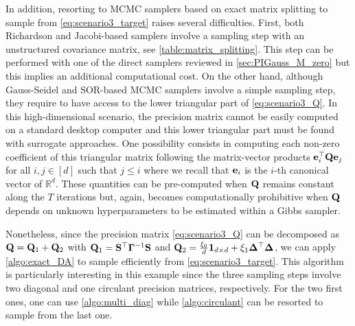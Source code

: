 \documentclass[nohypdvips,onefignum,onetabnum]{siamart171218}
\begin{document}
In addition, resorting to  MCMC samplers based on exact matrix splitting to sample from \cref{eq:scenario3_target} raises several difficulties.
First, both Richardson and Jacobi-based samplers involve a sampling step with an unstructured covariance matrix, see \cref{table:matrix_splitting}.
This step can be performed with one of the direct samplers reviewed in \cref{sec:PIGauss_M_zero} but this implies an additional computational cost.
On the other hand, although Gauss-Seidel and SOR-based MCMC samplers involve a simple sampling step, they require to have access to the lower triangular part of \cref{eq:scenario3_Q}.
In this high-dimensional scenario, the precision matrix cannot be easily computed on a standard desktop computer and this lower triangular part must be found with surrogate approaches.
One possibility consists in computing each non-zero coefficient of this triangular matrix following the matrix-vector products $\mathbf{e}_i^{\top}\mathbf{Q}\mathbf{e}_j$ for all $i,j \in [d]$ such that $j \leq i$ where we recall that $\mathbf{e}_i$ is the $i$-th canonical vector of $\mathbb{R}^d$.
These quantities can be pre-computed when $\mathbf{Q}$ remains constant along the $T$ iterations but, again, becomes computationally prohibitive when $\mathbf{Q}$ depends on unknown hyperparameters to be estimated within a Gibbs sampler. 

Nonetheless, since the precision matrix \cref{eq:scenario3_Q} can be decomposed as $\mathbf{Q} = \mathbf{Q}_1 + \mathbf{Q}_2$ with $\mathbf{Q}_1 = \mathbf{S}^{\top}\mathbf{\Gamma}^{-1}\mathbf{S}$ and $\mathbf{Q}_2 = \frac{\xi_0}{d}\mathbf{1}_{d \times d} + \xi_1\mathbf{\Delta}^{\top}\mathbf{\Delta}$, we can apply \cref{algo:exact_DA} to sample efficiently from \cref{eq:scenario3_target}.
This algorithm is particularly interesting in this example since the three sampling steps involve two diagonal and one circulant precision matrices, respectively.
For the two first ones, one can use \cref{algo:multi_diag} while \cref{algo:circulant} can be resorted to sample from the last one.
\end{document}
